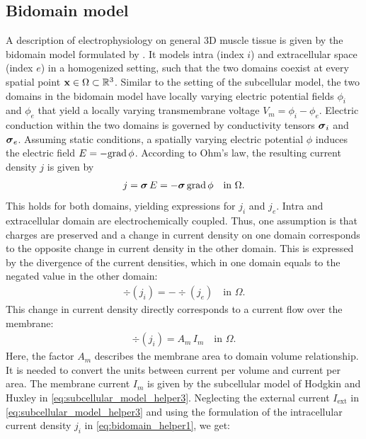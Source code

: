 
\subsection{Bidomain model}\label{sec:bidomain_model}

A description of electrophysiology on general 3D muscle tissue is given by the bidomain model formulated by \cite{tung1978bi,peskoff1979electric}. It models intra (index $i$) and extracellular space (index $e$) in a homogenized setting, such that the two domains coexist at every spatial point $\textbf{x} \in \Omega\subset \mathbb{R}^3$. Similar to the setting of the subcellular model, the two domains in the bidomain model have locally varying electric potential fields $\phi_i$ and $\phi_e$ that yield a locally varying transmembrane voltage $V_m=\phi_i - \phi_e$. Electric conduction within the two domains is governed by conductivity tensors $\boldsymbol{\sigma}_i$ and $\boldsymbol{\sigma}_e$. 
Assuming static conditions, a spatially varying electric potential $\phi$ induces the electric field $E=-\hbox{grad} \, \phi$.
According to Ohm's law, the resulting current density $j$ is given by 
%
\begin{align}\label{eq:bidomain_helper1}
  j = \boldsymbol{\sigma}\,E = -\boldsymbol{\sigma}\,\hbox{grad} \, \phi \quad \text{in }\Omega.
\end{align}
This holds for both domains, yielding expressions for $j_i$ and $j_e$.
Intra and extracellular domain are electrochemically coupled. Thus, one assumption is that charges are preserved and a change in current density on one domain corresponds to the opposite change in current density in the other domain. This is expressed by the divergence of the current densities, which in one domain equals to the negated value in the other domain:
%
\begin{align}\label{eq:bidomain_helper2}
  \div(j_i) = -\div(j_e) \quad \text{in }\Omega.
\end{align}
%
This change in current density directly corresponds to a current flow over the membrane:%
%
\begin{align*}
  \div(j_i) = A_m\,I_m \quad \text{in }\Omega.
\end{align*}
%
Here, the factor $A_m$ describes the membrane area to domain volume relationship. It is needed to convert the units between current per volume and current per area. The membrane current $I_m$ is given by the subcellular model of Hodgkin and Huxley in \cref{eq:subcellular_model_helper3}. Neglecting the external current $I_\text{ext}$ in \cref{eq:subcellular_model_helper3} and using the formulation of the intracellular current density $j_i$ in \cref{eq:bidomain_helper1}, we get:

